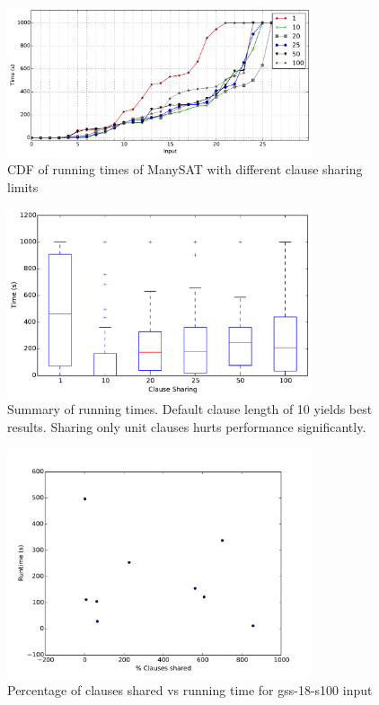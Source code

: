 \documentclass{article}
\begin{document}
\begin{figure}[h]
  \centering
  \includegraphics[width=0.8\textwidth]{../figs/scatter_cdf.pdf}
  \caption{CDF of running times of ManySAT with different clause sharing limits}
  \label{fig:cdf-1}
\end{figure}

\begin{figure}[h]
  \centering
    \includegraphics[width=0.8\textwidth]{../figs/boxplot_all.pdf}
  \caption{Summary of running times. Default clause length of 10 yields best results. Sharing only unit clauses hurts performance significantly.}
  \label{fig:boxplot-1}
\end{figure}



\begin{figure}[h]
  \centering
  \includegraphics[width=0.8\textwidth]{../figs/gss-18-s100.pdf}
  \caption{Percentage of clauses shared vs running time for gss-18-s100 input}
  \label{fig:gss}
\end{figure}
\end{document}
